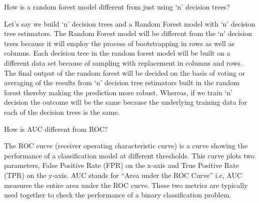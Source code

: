 	\begin{qanda}
		\begin{question}
How is a random forest model different from just using `n' decision trees?
		\end{question}
		\begin{answer}
Let's say we build `n' decision trees and a Random Forest model with `n' decision tree estimators. The Random Forest model will be different from the `n' decision trees because it will employ the process of bootstrapping in rows as well as columns. Each decision tree in the random forest model will be built on a different data set because of sampling with replacement in columns and rows.  The final output of the random forest will be decided on the basis of voting or averaging of the results from `n' decision tree estimators built in the random forest thereby making the prediction more robust.  Whereas, if we train `n' decision the outcome will be the same because the underlying training data for each of the decision trees is the same.
		\end{answer}
	\end{qanda}

	\begin{qanda}
		\begin{question}
How is AUC different from ROC?
		\end{question}
		\begin{answer}
The ROC curve (receiver operating characteristic curve) is a curve showing the performance of a classification model at different thresholds. This curve plots two parameters, False Positive Rate (FPR) on the x-axis and True Positive Rate (TPR) on the y-axis. AUC stands for ``Area under the ROC Curve'' i.e, AUC measures the entire area under the ROC curve. These two metrics are typically used together to check the performance of a binary classification problem.
		\end{answer}
	\end{qanda}

